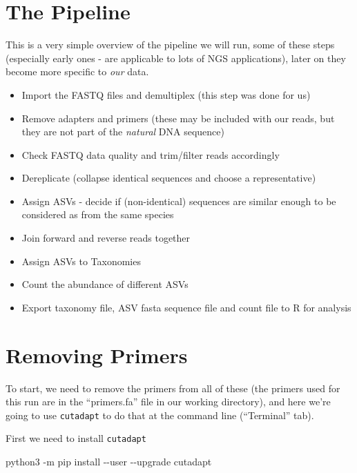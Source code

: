 \documentclass[
]{book}
\newenvironment{Shaded}{\begin{snugshade}}{\end{snugshade}}
\newcommand{\AttributeTok}[1]{\textcolor[rgb]{0.13,0.29,0.53}{#1}}
\newcommand{\ExtensionTok}[1]{#1}
\newcommand{\NormalTok}[1]{#1}
\begin{document}
\hypertarget{the-pipeline}{%
\section{The Pipeline}\label{the-pipeline}}

This is a very simple overview of the pipeline we will run, some of these steps (especially early ones - are applicable to lots of NGS applications), later on they become more specific to \emph{our} data.

\begin{itemize}
\item
  Import the FASTQ files and demultiplex (this step was done for us)
\item
  Remove adapters and primers (these may be included with our reads, but they are not part of the \emph{natural} DNA sequence)
\item
  Check FASTQ data quality and trim/filter reads accordingly
\item
  Dereplicate (collapse identical sequences and choose a representative)
\item
  Assign ASVs - decide if (non-identical) sequences are similar enough to be considered as from the same species
\item
  Join forward and reverse reads together
\item
  Assign ASVs to Taxonomies
\item
  Count the abundance of different ASVs
\item
  Export taxonomy file, ASV fasta sequence file and count file to R for analysis
\end{itemize}

\hypertarget{removing-primers}{%
\section{Removing Primers}\label{removing-primers}}

To start, we need to remove the primers from all of these (the primers used for this run are in the ``primers.fa'' file in our working directory), and here we're going to use \texttt{cutadapt} to do that at the command line (``Terminal'' tab).

First we need to install \texttt{cutadapt}

\begin{Shaded}
\begin{Highlighting}[]
\ExtensionTok{python3} \AttributeTok{{-}m}\NormalTok{ pip install }\AttributeTok{{-}{-}user} \AttributeTok{{-}{-}upgrade}\NormalTok{ cutadapt}
\end{Highlighting}
\end{Shaded}
\end{document}
